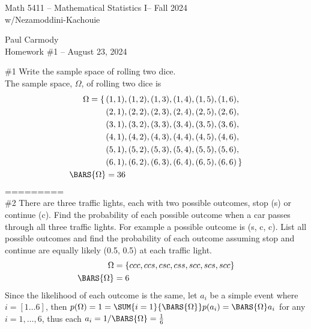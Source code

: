 \documentclass[10pt,a4paper]{report}
\newcommand{\CLASSNAME}{Math 5411 -- Mathematical Statistics I}
\newcommand{\PROFESSOR}{Nezamoddini-Kachouie}
\newcommand{\STUDENTNAME}{Paul Carmody}
\newcommand{\ASSIGNMENT}{Homework \#1 }
\newcommand{\DUEDATE}{August 23, 2024}
\newcommand{\SEMESTER}{Fall 2024}
\begin{document}
\begin{center}
	\Large{\CLASSNAME -- \SEMESTER} \\
	\large{w/\PROFESSOR}
\end{center}
\begin{center}
	\STUDENTNAME \\
	\ASSIGNMENT -- \DUEDATE\\
\end{center}

\#1 Write the sample space of rolling two dice.\\

The sample space, $\Omega$, of rolling two dice is 
\begin{align*}
	\Omega = \{\, &(1,1), (1,2), (1,3), (1,4), (1,5), (1,6), \\
	&(2,1), (2,2), (2,3), (2,4), (2,5), (2,6), \\
	&(3,1), (3,2), (3,3), (3,4), (3,5), (3,6), \\
	&(4,1), (4,2), (4,3), (4,4), (4,5), (4,6), \\
	&(5,1), (5,2), (5,3), (5,4), (5,5), (5,6), \\
	&(6,1), (6,2), (6,3), (6,4), (6,5), (6,6) \, \} \\
	\BARS{\Omega} &= 36
\end{align*}
=========\\

\#2 There are three traffic lights, each with two possible outcomes, stop (s) or continue (c). Find the probability of each possible outcome when a car passes through all three traffic lights. For example a possible outcome is (s, c, c). List all possible outcomes and find the probability of each outcome assuming stop and continue are equally likely (0.5, 0.5) at each traffic light.
\begin{align*}
	\Omega &= \{ ccc, ccs, csc, css, scc, scs, scc \} \\
	\BARS{\Omega} &= 6 
\end{align*} Since the likelihood of each outcome is the same, let $a_i$ be a simple event where $i=[1\dots 6]$, then $p(\Omega)=1= \SUM{i=1}{\BARS{\Omega}} p(a_i)=\BARS{\Omega}a_i$ for any $i=1,\dots,6$, thus each $a_i = 1/\BARS{\Omega}= \frac{1}{6}$
\end{document}

